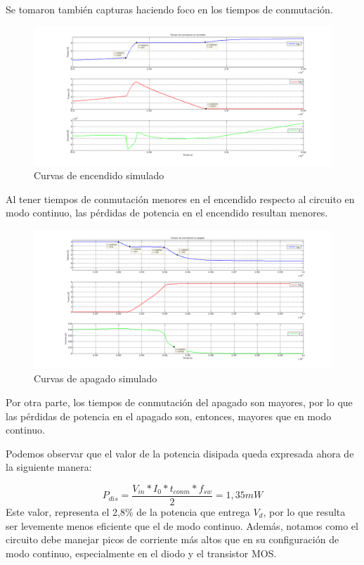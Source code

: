 \documentclass[e4_tp1_main.tex]{subfiles}
\begin{document}
Se tomaron también capturas haciendo foco en los tiempos de conmutación.

\begin{figure}[H]
\centering
\includegraphics[width=1\linewidth]{Imagenes/Punto4/tiempos_encendidoX.png}
\caption{Curvas de encendido simulado}
\end{figure}

Al tener tiempos de conmutación menores en el encendido respecto al circuito en modo continuo, las pérdidas de potencia en el encendido resultan menores.

\begin{figure}[H]
\centering
\includegraphics[width=1\linewidth]{Imagenes/Punto4/tiempos_apagadoX.png}
\caption{Curvas de apagado simulado}
\end{figure}

Por otra parte, los tiempos de conmutación del apagado son mayores, por lo que las pérdidas de potencia en el apagado son, entonces, mayores que en modo continuo.\par
Podemos observar que el valor de la potencia disipada queda expresada ahora de la siguiente manera:\par
\[ P_{dis} = \frac{V_{in}*I_0*t_{conm}*f_{sw}}{2} = 1,35 mW  \] 
Este valor, representa el 2,8\% de la potencia que entrega $V_d$, por lo que resulta ser levemente menos eficiente que el de modo continuo. Además, notamos como el circuito debe manejar picos de corriente más altos que en su configuración de modo continuo, especialmente en el diodo y el transistor MOS.

\newpage
\end{document}
